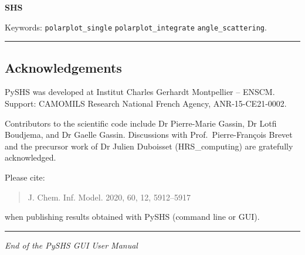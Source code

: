 \begin{Shaded}
\begin{Highlighting}[]
 \OperatorTok{\textless{}}\OperatorTok{\textgreater{}} \OperatorTok{\textless{}}\OperatorTok{\textgreater{}} \OperatorTok{\textless{}}\OperatorTok{\textgreater{}}
\end{Highlighting}
\end{Shaded}

\textbf{SHS}

\begin{Shaded}
\begin{Highlighting}[]
 \OperatorTok{\textless{}}\OperatorTok{\textgreater{}} \OperatorTok{\textless{}}\OperatorTok{\textgreater{}} \OperatorTok{\textless{}}\OperatorTok{\textgreater{}} \OperatorTok{\textless{}}\OperatorTok{\textgreater{}}
\end{Highlighting}
\end{Shaded}

Keywords: \texttt{polarplot\_single} \textbar{}
\texttt{polarplot\_integrate} \textbar{} \texttt{angle\_scattering}.

\begin{center}\rule{0.5\linewidth}{0.5pt}\end{center}

\hypertarget{acknowledgements}{%
\subsection{Acknowledgements}\label{acknowledgements}}

PySHS was developed at Institut Charles Gerhardt Montpellier -- ENSCM.\\
Support: CAMOMILS Research National French Agency, ANR-15-CE21-0002.

Contributors to the scientific code include Dr Pierre-Marie Gassin, Dr
Lotfi Boudjema, and Dr Gaelle Gassin. Discussions with
Prof.~Pierre-François Brevet and the precursor work of Dr Julien
Duboisset (HRS\_computing) are gratefully acknowledged.

Please cite:

\begin{quote}
J. Chem. Inf. Model. 2020, 60, 12, 5912--5917
\end{quote}

when publishing results obtained with PySHS (command line or GUI).

\begin{center}\rule{0.5\linewidth}{0.5pt}\end{center}

\emph{End of the PySHS GUI User Manual}
